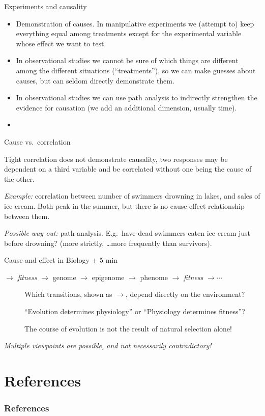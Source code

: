 \documentclass[10pt]{beamer}
\begin{document}
\begin{frame}{Experiments and causality}
\begin{itemize}
\item Demonstration of causes. In manipulative experiments we (attempt to) keep
everything equal among treatments except for the experimental
variable whose effect we want to test.

\item In observational studies we cannot be sure of which things
are different among the different situations (``treatments''), so we
can make guesses about causes, but can seldom directly demonstrate them.

\item In observational studies we can use path analysis to indirectly strengthen the evidence for causation (we add an additional dimension, usually time).

\item \DExamples

\end{itemize}
\end{frame}

\begin{frame}{Cause vs.\ correlation}

Tight correlation does not demonstrate causality, two responses may
be dependent on a third variable and be correlated without one being
the cause of the other. \vspace{5mm} \pause

\emph{Example:} correlation between number of swimmers drowning in
lakes, and sales of ice cream. Both peak in the summer, but there is
no cause-effect relationship between them.

\emph{Possible way out:} path analysis. E.g.\ have dead swimmers eaten
ice cream just before drowning? (more strictly, \ldots more frequently than survivors).

\end{frame}

\begin{frame}{Cause and effect in Biology  + 5 min}

\begin{centering}
$\to$ \emph{fitness} $\to$ genome $\to$  epigenome $\to$ phenome $\to$ \emph{fitness} $\to \cdots$
\vspace{3ex}
\end{centering}

\begin{description}
  \item[\DiscussionI] Which transitions, shown as $\to$, depend directly on the environment?
  \item[\DiscussionI] ``Evolution determines physiology'' or ``Physiology determines fitness''?
  \item[\Attention] The course of evolution is not the result of natural selection alone!
\end{description}
\pause
\Attention \emph{Multiple viewpoints are possible, and not necessarily contradictory!}
\end{frame}


  \section*{References}
  \begin{frame}[t,allowframebreaks]
    \frametitle{References}
    \printbibliography
  \end{frame}
\end{document}
